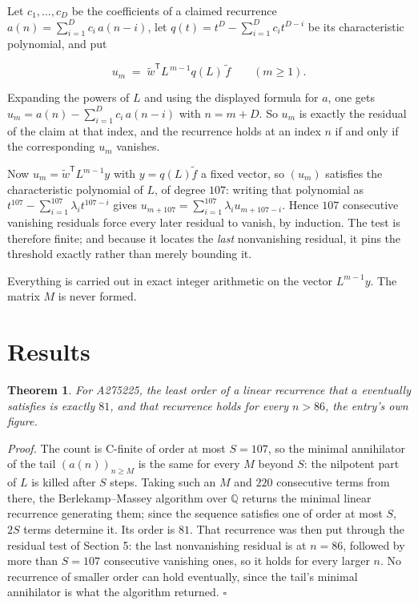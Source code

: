 \documentclass[11pt]{article}
\newtheorem{theorem}{Theorem}
\theoremstyle{definition}
\begin{document}
Let $c_1,\dots,c_D$ be the coefficients of a claimed recurrence $a(n) = \sum_{i=1}^{D} c_i\,a(n-i)$, let $q(t) = t^{D} - \sum_{i=1}^{D} c_i t^{D-i}$ be its characteristic polynomial, and put

\[u_m \;=\; \tilde w^{\mathsf T} L^{\,m-1} q(L)\,\tilde f \qquad (m \ge 1).\]

Expanding the powers of $L$ and using the displayed formula for $a$, one gets $u_m = a(n) - \sum_{i=1}^{D} c_i\,a(n-i)$ with $n = m + D$. So $u_m$ is exactly the residual of the claim at that index, and the recurrence holds at an index $n$ if and only if the corresponding $u_m$ vanishes.

Now $u_m = \tilde w^{\mathsf T} L^{m-1} y$ with $y = q(L)\tilde f$ a fixed vector, so $(u_m)$ satisfies the characteristic polynomial of $L$, of degree $107$: writing that polynomial as $t^{107} - \sum_{i=1}^{107} \lambda_i t^{107-i}$ gives $u_{m+107} = \sum_{i=1}^{107} \lambda_i u_{m+107-i}$. Hence $107$ consecutive vanishing residuals force every later residual to vanish, by induction. The test is therefore finite; and because it locates the {\itshape last} nonvanishing residual, it pins the threshold exactly rather than merely bounding it.

Everything is carried out in exact integer arithmetic on the vector $L^{m-1}y$. The matrix $M$ is never formed.

\section{Results}

\begin{theorem} For A275225, the least order of a linear recurrence that $a$ eventually satisfies is exactly $81$, and that recurrence holds for every $n > 86$, the entry's own figure.\end{theorem}

{\itshape Proof.} The count is C-finite of order at most $S = 107$, so the minimal annihilator of the tail $(a(n))_{n \ge M}$ is the same for every $M$ beyond $S$: the nilpotent part of $L$ is killed after $S$ steps. Taking such an $M$ and $220$ consecutive terms from there, the Berlekamp--Massey algorithm over $\mathbb{Q}$ returns the minimal linear recurrence generating them; since the sequence satisfies one of order at most $S$, $2S$ terms determine it. Its order is $81$. That recurrence was then put through the residual test of Section 5: the last nonvanishing residual is at $n = 86$, followed by more than $S = 107$ consecutive vanishing ones, so it holds for every larger $n$. No recurrence of smaller order can hold eventually, since the tail's minimal annihilator is what the algorithm returned. $\square$
\end{document}
